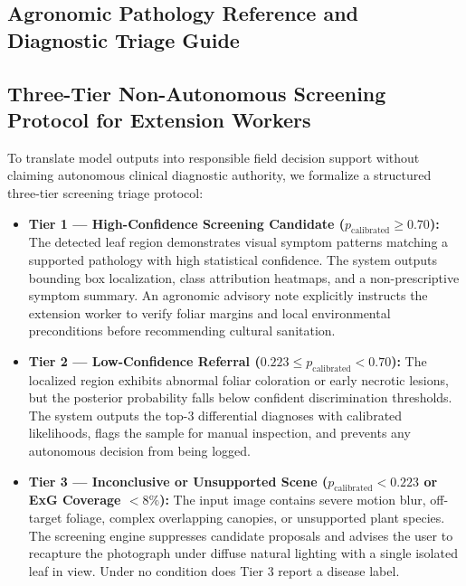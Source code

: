 \documentclass[pdflatex,sn-mathphys-num]{sn-jnl}
\theoremstyle{thmstyleone}%
\theoremstyle{thmstyletwo}%
\theoremstyle{thmstylethree}%
\begin{document}
\begin{appendices}

\section{Agronomic Pathology Reference and Diagnostic Triage Guide}
\label{sec:appendix_e}

\subsection{Three-Tier Non-Autonomous Screening Protocol for Extension Workers}
To translate model outputs into responsible field decision support without claiming autonomous clinical diagnostic authority, we formalize a structured three-tier screening triage protocol:

\begin{itemize}
  \item \textbf{Tier 1 --- High-Confidence Screening Candidate ($p_{\text{calibrated}} \ge 0.70$):} The detected leaf region demonstrates visual symptom patterns matching a supported pathology with high statistical confidence. The system outputs bounding box localization, class attribution heatmaps, and a non-prescriptive symptom summary. An agronomic advisory note explicitly instructs the extension worker to verify foliar margins and local environmental preconditions before recommending cultural sanitation.
  \item \textbf{Tier 2 --- Low-Confidence Referral ($0.223 \le p_{\text{calibrated}} < 0.70$):} The localized region exhibits abnormal foliar coloration or early necrotic lesions, but the posterior probability falls below confident discrimination thresholds. The system outputs the top-3 differential diagnoses with calibrated likelihoods, flags the sample for manual inspection, and prevents any autonomous decision from being logged.
  \item \textbf{Tier 3 --- Inconclusive or Unsupported Scene ($p_{\text{calibrated}} < 0.223$ or ExG Coverage $< 8\%$):} The input image contains severe motion blur, off-target foliage, complex overlapping canopies, or unsupported plant species. The screening engine suppresses candidate proposals and advises the user to recapture the photograph under diffuse natural lighting with a single isolated leaf in view. Under no condition does Tier 3 report a disease label.
\end{itemize}


\end{appendices}
\end{document}
